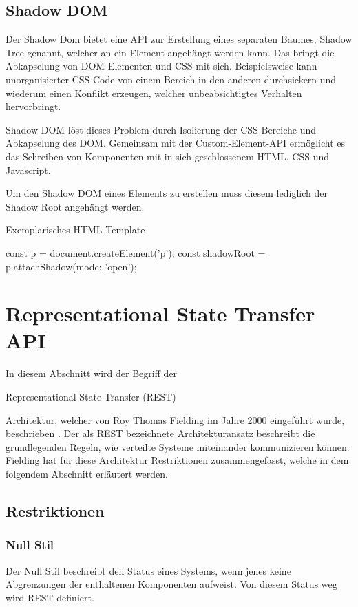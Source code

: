 \subsection{Shadow DOM}
Der Shadow Dom bietet eine API zur Erstellung eines separaten Baumes, Shadow Tree genannt, welcher an ein Element angehängt werden kann.
Das bringt die Abkapselung von DOM-Elementen und CSS mit sich. Beispielsweise kann unorganisierter CSS-Code von einem Bereich in den anderen durchsickern und wiederum einen Konflikt erzeugen, welcher unbeabsichtigtes Verhalten hervorbringt. 

Shadow DOM löst dieses Problem durch Isolierung der CSS-Bereiche und Abkapselung des DOM. 
Gemeinsam mit der Custom-Element-API ermöglicht es das Schreiben von Komponenten mit in sich geschlossenem HTML, CSS und Javascript.

Um den Shadow DOM eines Elements zu erstellen muss diesem lediglich der Shadow Root angehängt werden.
\begin{program}[!htbp]
\caption{Exemplarisches HTML Template}
\label{prog:shadow-dom}
\begin{JsCode}
const p = document.createElement('p');
const shadowRoot = p.attachShadow({mode: 'open'});
\end{JsCode}
\end{program}

\section{Representational State Transfer  API}
In diesem Abschnitt wird der Begriff der \begin{english}
Representational State Transfer (REST)
\end{english} Architektur, welcher von Roy Thomas Fielding im Jahre 2000 eingeführt wurde, beschrieben \cite{rest}.
Der als REST bezeichnete Architekturansatz beschreibt die grundlegenden Regeln, wie verteilte Systeme miteinander kommunizieren können.
Fielding hat für diese Architektur Restriktionen zusammengefasst, welche in dem folgendem Abschnitt erläutert werden.
\subsection{Restriktionen}
\subsubsection{Null Stil}
Der Null Stil beschreibt den Status eines Systems, wenn jenes keine Abgrenzungen der enthaltenen Komponenten aufweist. Von diesem Status weg wird REST definiert. 
